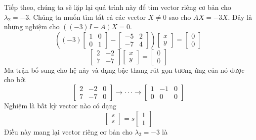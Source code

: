 Tiếp theo, chúng ta sẽ lặp lại quá trình này để tìm vector riêng cơ bản cho $\lambda_{2}=-3$. Chúng ta muốn tìm tất cả các vector $X\ne0$ sao cho $AX=-3X$. Đây là những nghiệm cho $((-3)I-A)X=0$.
\begin{equation*}
\left((-3)\begin{bmatrix}1&0\\ 0&1\end{bmatrix}-\begin{bmatrix}-5&2\\ -7&4\end{bmatrix}\right)\begin{bmatrix}x\\ y\end{bmatrix}=\begin{bmatrix}0\\ 0\end{bmatrix}
\end{equation*}
\begin{equation*}
\begin{bmatrix}2&-2\\ 7&-7\end{bmatrix}\begin{bmatrix}x\\ y\end{bmatrix}=\begin{bmatrix}0\\ 0\end{bmatrix}
\end{equation*}
Ma trận bổ sung cho hệ này và dạng bậc thang rút gọn tương ứng của nó được cho bởi
\begin{equation}
\begin{bmatrix}2&-2&0\\ 7&-7&0\end{bmatrix}\rightarrow\cdot\cdot\cdot\rightarrow\begin{bmatrix}1&-1&0\\ 0&0&0\end{bmatrix}
\end{equation}
Nghiệm là bất kỳ vector nào có dạng
\begin{equation*}
\begin{bmatrix}s\\ s\end{bmatrix}=s\begin{bmatrix}1\\ 1\end{bmatrix}
\end{equation*}
Điều này mang lại vector riêng cơ bản cho $\lambda_{2}=-3$ là
